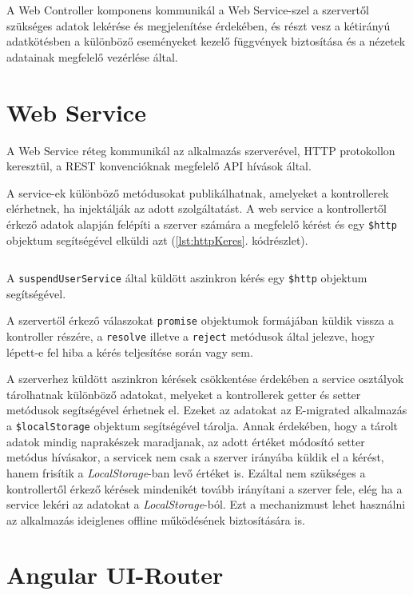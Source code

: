 A Web Controller komponens kommunikál a Web Service-szel a szervertől szükséges adatok lekérése és megjelenítése érdekében, és részt vesz a kétirányú adatkötésben a különböző eseményeket kezelő függvények biztosítása és a nézetek adatainak megfelelő vezérlése által. 

\section{Web Service}
\label{sec:webService}
A Web Service réteg kommunikál az alkalmazás szerverével, HTTP protokollon keresztül, a REST konvencióknak megfelelő API hívások által. 

A service-ek különböző metódusokat publikálhatnak, amelyeket a kontrollerek elérhetnek, ha injektálják az adott szolgáltatást. A web service a kontrollertől érkező adatok alapján felépíti a szerver számára a megfelelő kérést és egy \texttt{\$http} objektum segítségével elküldi azt (\ref{lst:httpKeres}. kódrészlet).

\begin{listing}
  \inputminted[fontsize=\small]{js}{progfiles/httpKeres.js}
  \caption{A \texttt{suspendUserService} által küldött aszinkron kérés egy \texttt{\$http} objektum segítségével.}
  \label{lst:httpKeres}
\end{listing}
A szervertől érkező válaszokat \texttt{promise} objektumok formájában küldik vissza a kontroller részére, a \texttt{resolve} illetve a \texttt{reject} metódusok által jelezve, hogy lépett-e fel hiba a kérés teljesítése során vagy sem. 

A szerverhez küldött aszinkron kérések csökkentése érdekében a service osztályok tárolhatnak különböző adatokat, melyeket a kontrollerek getter és setter metódusok segítségével érhetnek el. Ezeket az adatokat az E-migrated alkalmazás a \texttt{\$localStorage} objektum segítségével tárolja. Annak érdekében, hogy a tárolt adatok mindig naprakészek maradjanak, az adott értéket módosító setter metódus hívásakor, a servicek nem csak a szerver irányába küldik el a kérést, hanem frisítik a \textit{LocalStorage}-ban levő értéket is. Ezáltal nem szükséges a kontrollertől érkező kérések mindenikét tovább irányítani a szerver fele, elég ha a service lekéri az adatokat a  \textit{LocalStorage}-ból. Ezt a mechanizmust lehet használni az alkalmazás ideiglenes offline működésének biztosítására is. 

\section{Angular UI-Router}
\label{UI-Router}

